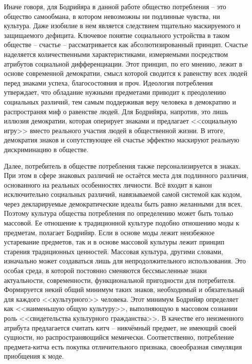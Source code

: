 Иначе говоря, для Бодрийяра в данной работе общество потребления -- это общество
самообмана, в котором невозможны ни подлинные чувства, ни культура.
Даже изобилие в нем является следствием тщательно маскируемого и защищаемого дефицита.
Ключевое понятие социального устройства в таком обществе -- счастье --
рассматривается как абсолютизированный принцип. Счастье наделяется количественными
характеристиками, измеряемыми посредством атрибутов социальной дифференциации.
Этот принцип, по его мнению, лежит в основе современной демократии, смысл которой
сводится к равенству всех людей перед знаками успеха, благосостояния и проч.
Идеология потребления утверждает, что обладание нужными предметами приводит к
преодолению социальных различий, тем самым поддерживая веру человека в демократию и
распространяя миф о равенстве людей. Для Бодрийяра, напротив, это лишь иллюзия
демократии, которая оперирует знаками и предлагает <<социальную игру>>
вместо реального участия людей в общественной жизни. В итоге, демократия знаков и
сопутствующее ей счастье эффектно маскируют реальную дискриминацию в обществе.
\autocite[][73--116]{bodriyar_society}

Далее, потребитель в обществе потребления также персонализируется в знаках.
При этом в сфере знаковых различий не остаётся места для подлинного различия,
основанного на реальных особенностях личности. Всё входит в канон исключительно
социальных различий, навязываемой самой системой как кодом, через декларируемые
демократические идеалы быть равно желанными для всех. \autocite[][117--128]{bodriyar_society}
Поэтому культура общества потребления по определению может быть только массовой. Ее отношение
к традиционной культуре подобно отношению моды к предметам, полагает Бодрийяр.
Если в основе моды лежит неизбежное устаревание предметов, так и в основе массовой
культуры лежит принцип старения традиционных ценностей. Массовая культура, другими
словами, изначально может создаваться лишь для непродолжительного использования.
Это особая среда, в которой постоянно сменяются бессмысленные знаки актуальности,
современности, функциональной пригодности для потребителя. Формируется некий общий
минимум таких знаков, необходимый и обязательный для каждого <<культурного>> человека.
Этот минимум Бодрийяр определяет как <<наименьшую общую культуру>>,
выполняющую в массовом сознании роль <<свидетельства культурного гражданства>>.
\autocite[][136--143]{bodriyar_society} В качестве его неизменного атрибута предлагается считать
китч -- никчёмный предмет, не имеющий своей сущности, но распространяющийся
мемически. Соответственно, потребление предмета-китча есть покупка отличительного признака,
своеобразная симуляция приобщения к моде. \autocite[][144--146]{bodriyar_society}

